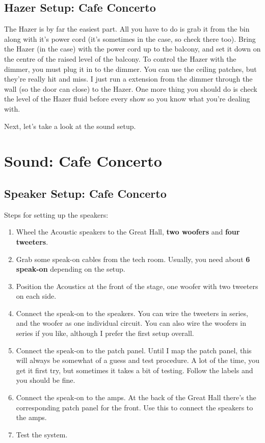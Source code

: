 \documentclass[11pt,a4paper]{book}
\begin{document}
\begin{enumerate}
\subsection{Hazer Setup: Cafe Concerto}
The Hazer is by far the easiest part. All you have to do is grab it from the bin along with it's power cord (it's sometimes in the case, so check there too). Bring the Hazer (in the case) with the power cord up to the balcony, and set it down on the centre of the raised level of the balcony. To control the Hazer with the dimmer, you must plug it in to the dimmer. You can use the ceiling patches, but they're really hit and miss. I just run a extension from the dimmer through the wall (so the door can close) to the Hazer. One more thing you should do is check the level of the Hazer fluid before every show so you know what you're dealing with.

Next, let's take a look at the sound setup.

\section{Sound: Cafe Concerto}
\subsection{Speaker Setup: Cafe Concerto}

Steps for setting up the speakers:
\begin{enumerate}
\item Wheel the Acoustic speakers to the Great Hall, \textbf{two woofers} and \textbf{four tweeters}.
\item Grab some speak-on cables from the tech room. Usually, you need about \textbf{6 speak-on} depending on the setup.
\item Position the Acoustics at the front of the stage, one woofer with two tweeters on each side.
\item Connect the speak-on to the speakers. You can wire the tweeters in series, and the woofer as one individual circuit. You can also wire the woofers in series if you like, although I prefer the first setup overall.
\item Connect the speak-on to the patch panel. Until I map the patch panel, this will always be somewhat of a guess and test procedure. A lot of the time, you get it first try, but sometimes it takes a bit of testing. Follow the labels and you should be fine.
\item Connect the speak-on to the amps. At the back of the Great Hall there's the corresponding patch panel for the front. Use this to connect the speakers to the amps.
\item Test the system.
\end{enumerate} 


\end{enumerate}
\end{document}
